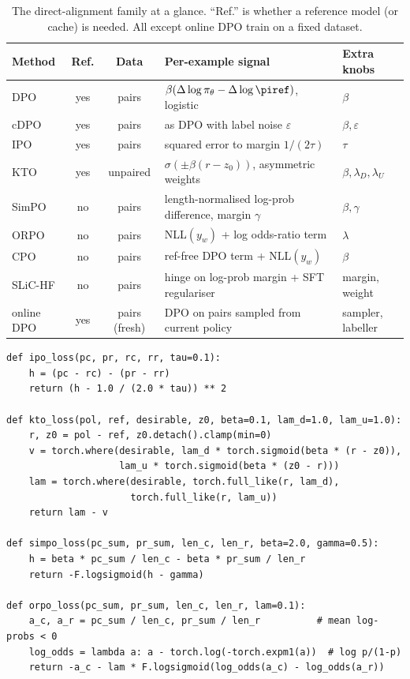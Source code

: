 \begin{table}[t]
\centering\small
\begin{tabularx}{\linewidth}{@{}lccXl@{}}
\toprule
\textbf{Method} & \textbf{Ref.} & \textbf{Data} & \textbf{Per-example signal} & \textbf{Extra knobs}\\
\midrule
DPO & yes & pairs & $\beta(\Delta\log\pi_\theta-\Delta\log\piref)$, logistic & $\beta$\\
cDPO & yes & pairs & as DPO with label noise $\varepsilon$ & $\beta,\varepsilon$\\
IPO & yes & pairs & squared error to margin $1/(2\tau)$ & $\tau$\\
KTO & yes & unpaired & $\sigma(\pm\beta(r-z_0))$, asymmetric weights & $\beta,\lambda_D,\lambda_U$\\
SimPO & no & pairs & length-normalised log-prob difference, margin $\gamma$ & $\beta,\gamma$\\
ORPO & no & pairs & NLL$(y_w)$ + log odds-ratio term & $\lambda$\\
CPO & no & pairs & ref-free DPO term + NLL$(y_w)$ & $\beta$\\
SLiC-HF & no & pairs & hinge on log-prob margin + SFT regulariser & margin, weight\\
online DPO & yes & pairs (fresh) & DPO on pairs sampled from current policy & sampler, labeller\\
\bottomrule
\end{tabularx}
\caption{The direct-alignment family at a glance. ``Ref.'' is whether a reference model (or cache)
is needed. All except online DPO train on a fixed dataset.}
\label{tab:dpo:family}
\end{table}

\begin{lstlisting}[caption={Four relatives in a few lines each (from \ident{llmsys/prefopt.py}). Sums are over response tokens; \code{len\_*} are token counts.},label={lst:dpo:family}]
def ipo_loss(pc, pr, rc, rr, tau=0.1):
    h = (pc - rc) - (pr - rr)
    return (h - 1.0 / (2.0 * tau)) ** 2

def kto_loss(pol, ref, desirable, z0, beta=0.1, lam_d=1.0, lam_u=1.0):
    r, z0 = pol - ref, z0.detach().clamp(min=0)
    v = torch.where(desirable, lam_d * torch.sigmoid(beta * (r - z0)),
                    lam_u * torch.sigmoid(beta * (z0 - r)))
    lam = torch.where(desirable, torch.full_like(r, lam_d),
                      torch.full_like(r, lam_u))
    return lam - v

def simpo_loss(pc_sum, pr_sum, len_c, len_r, beta=2.0, gamma=0.5):
    h = beta * pc_sum / len_c - beta * pr_sum / len_r
    return -F.logsigmoid(h - gamma)

def orpo_loss(pc_sum, pr_sum, len_c, len_r, lam=0.1):
    a_c, a_r = pc_sum / len_c, pr_sum / len_r          # mean log-probs < 0
    log_odds = lambda a: a - torch.log(-torch.expm1(a))  # log p/(1-p)
    return -a_c - lam * F.logsigmoid(log_odds(a_c) - log_odds(a_r))
\end{lstlisting}

